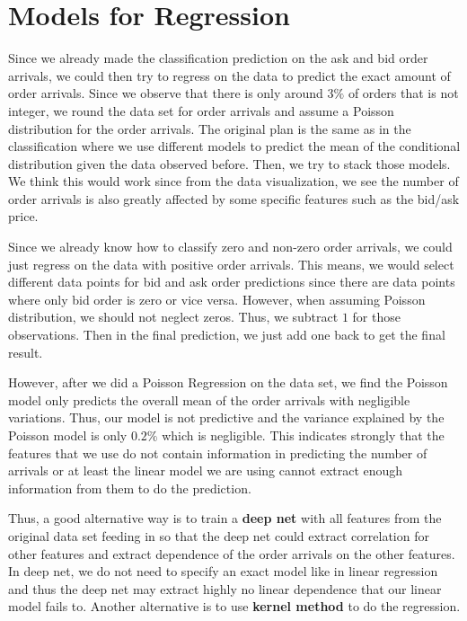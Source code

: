 \documentclass[letterpaper,12pt]{article}
\numberwithin{equation}{section}
\begin{document}
\section{Models for Regression}
Since we already made the classification prediction on the ask and bid order arrivals, we could then try to regress on the data to predict the exact amount of order arrivals.  Since we observe that there is only around $3\%$ of orders that is not integer, we round the data set for order arrivals and assume a Poisson distribution for the order arrivals.  The original plan is the same as in the classification where we use different models to predict the mean of the conditional distribution given the data observed before. Then, we try to stack those models. We think this would work since from the data visualization, we see the number of order arrivals is also greatly affected by some specific features such as the bid/ask price.

Since we already know how to classify zero and non-zero order arrivals, we could just regress on the data with positive order arrivals. This means, we would select different data points for bid and ask order predictions since there are data points where only bid order is zero or vice versa. However, when assuming Poisson distribution, we should not neglect zeros. Thus, we subtract $1$ for those observations. Then in the final prediction, we just add one back to get the final result. 

However, after we did a Poisson Regression on the data set, we find the Poisson model only predicts the overall mean of the order arrivals with negligible variations. Thus, our model is not predictive and the variance explained by the Poisson model is only $0.2\%$ which is negligible. This indicates strongly that the features that we use do not contain information in predicting the number of arrivals or at least the linear model we are using cannot extract enough information from them to do the prediction. 

Thus, a good alternative way is to train a \textbf{deep net} with all features from the original data set feeding in so that the deep net could extract correlation for other features and extract dependence of the order arrivals on the other features. In deep net, we do not need to specify an exact model like in linear regression and thus the deep net may extract highly no linear dependence that our linear model fails to. Another alternative is to use \textbf{kernel method} to do the regression. {\color{red}{However, since we do not have enough time, we did not try those two alternatives.}} 
\end{document}
